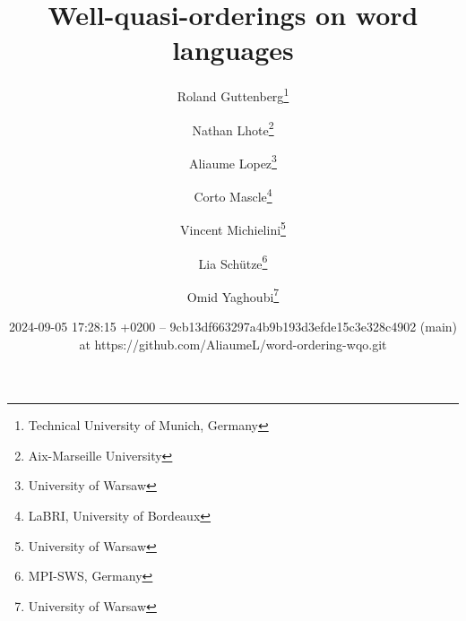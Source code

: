 %

\title{Well-quasi-orderings on word languages}
\author{%
        Roland Guttenberg\thanks{Technical University of Munich,
Germany}
     \and
        Nathan Lhote\thanks{Aix-Marseille University}
     \and
        Aliaume Lopez\thanks{University of Warsaw}
     \and
        Corto Mascle\thanks{LaBRI, University of Bordeaux}
     \and
        Vincent Michielini\thanks{University of Warsaw}
     \and
        Lia Schütze\thanks{MPI-SWS, Germany}
     \and
        Omid Yaghoubi\thanks{University of Warsaw}
    }

\date{2024-09-05 17:28:15
+0200 -- 9cb13df663297a4b9b193d3efde15c3e328c4902 (main) at https://github.com/AliaumeL/word-ordering-wqo.git}

\newcommand{\makeabstract}{
\begin{abstract}
    The set of finite words over a well-quasi-ordered set is itself
    well-quasi-ordered. This seminal result by Higman is a cornerstone
    of the theory of well-quasi-orderings and has found numerous
    applications in computer science. However, this result is based on a
    specific choice of ordering on words, the (scattered) subword
    ordering. In this paper, we describe to what extent other natural
    orderings (prefix, suffix, and infix) on words can be used to derive
    Higman-like theorems. More specifically, we are interested in
    characterizing \emph{languages} of words that are well-quasi-ordered
    under these orderings. We show that a simple characterization is
    possible for the prefix and suffix orderings, and that under extra
    regularity assumptions, this also extends to the infix ordering.
\end{abstract}
}
